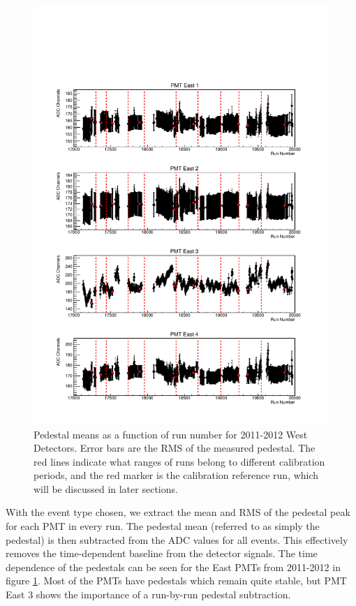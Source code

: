 \begin{figure}[p] 
\centering
\includegraphics[page=2,scale=0.8]{3-UCNAAnalysis/2011-2012_pedestals.pdf}
\caption{Pedestal means as a function of run number for 2011-2012 West Detectors. Error bars are the
  RMS of the measured pedestal. The red lines indicate what ranges of runs belong to
  different calibration periods, and the red marker is the calibration reference run,
  which will be discussed in later sections.}
\label{fig:peds_timeDep}
\end{figure}

With the event type chosen, we extract the mean and RMS of the pedestal peak
for each PMT in every run. The pedestal mean (referred to as simply
the pedestal) is then subtracted from the ADC values for all events. This effectively
removes the time-dependent baseline from the detector signals. The time dependence of
the pedestals can be seen for the East PMTs from 2011-2012 in figure \ref{fig:peds_timeDep}.
Most of the PMTs have pedestals which remain quite stable, but PMT East 3 shows the
importance of a run-by-run pedestal subtraction.



